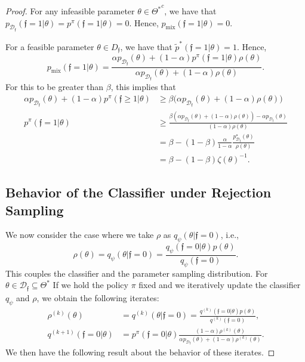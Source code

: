\documentclass{article} %
\newcommand{\feas}{\mathfrak{f}}
\newcommand{\CISet}{\Theta^*}
\newcommand{\MeasuredCISet}{\mathcal{D}_{\feas{}}}
\begin{document}
\begin{proof}
For any infeasible parameter $\theta \in {\Theta^*}^c$, we have that $p_{\MeasuredCISet}(\feas{} = 1 | \theta) = p^\pi(\feas{} = 1 | \theta) = 0$. Hence, $p_{\text{mix}}(\feas{} = 1 | \theta) = 0$.

For a feasible parameter $\theta \in D_{\feas{}}$, we have that $\tilde{p}^*(\feas{} = 1 | \theta) = 1$. Hence,
\begin{equation}
p_{\text{mix}}(\feas{} = 1 | \theta) = \frac{ \alpha p_{\MeasuredCISet}(\theta) + (1 - \alpha) p^\pi(\feas{} = 1 | \theta) \rho(\theta) }{ \alpha p_{\MeasuredCISet}(\theta) + (1 - \alpha) \rho(\theta) }.
\end{equation}
For this to be greater than $\beta$, this implies that
\begin{align}
\alpha p_{\MeasuredCISet}(\theta) + (1-\alpha) p^\pi(\feas{} \geq 1 | \theta) &\geq \beta \big( \alpha p_{\MeasuredCISet}(\theta) + (1 - \alpha) \rho(\theta) \big) \\
p^\pi(\feas{} = 1 | \theta)
&\geq \frac{ \beta ( \alpha p_{\MeasuredCISet}(\theta) + (1-\alpha) \rho(\theta) ) - \alpha p_{\MeasuredCISet}(\theta) }{ (1-\alpha) \rho(\theta)} \\
&= \beta - (1 - \beta) \frac{ \alpha }{ 1 - \alpha } \frac{ p_{\MeasuredCISet}^\star(\theta) }{ \rho(\theta) } \\
&= \beta - (1 - \beta) \zeta(\theta)^{-1}.
\end{align}

\subsection{Behavior of the Classifier under Rejection Sampling}
We now consider the case where we take $\rho$ as $q_\psi(\theta | \feas{}=0)$, i.e.,
\begin{equation}
    \rho(\theta) = q_\psi(\theta | \feas{}=0) = \frac{ q_\psi(\feas{}=0 | \theta) p(\theta)}{ q_\psi(\feas{}=0) }.
\end{equation}
This couples the classifier and the parameter sampling distribution. For $\theta \in \MeasuredCISet \subseteq \CISet$ If we hold the policy $\pi$ fixed and we iteratively update the classifier $q_\psi$ and $\rho$, we obtain the following iterates:
\begin{align}
    \rho^{(k)}(\theta) &= q^{(k)}(\theta | \feas{}=0) = \frac{ q^{(k)}(\feas{}=0 | \theta) p(\theta) }{ q^{(k)}(\feas{}=0) }, \\
    q^{(k+1)}(\feas{}=0 | \theta)
    &= p^\pi(\feas{}=0 | \theta) \frac{ (1-\alpha) \rho^{(k)}(\theta) }{ \alpha p_{\MeasuredCISet}(\theta) + (1-\alpha) \rho^{(k)}(\theta) }.
\end{align}
We then have the following result about the behavior of these iterates.


\end{proof}
\end{document}
